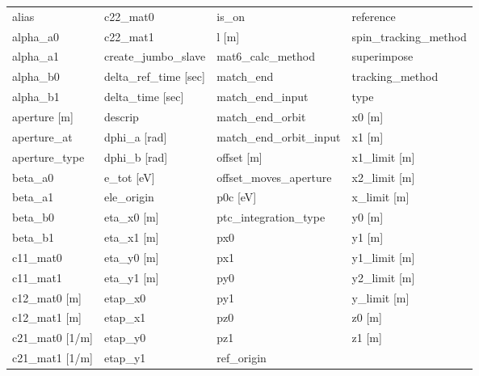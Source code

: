  \begin{tabular}{llll} \toprule
alias                          & c22_mat0                       & is_on                          & reference                      \\
alpha_a0                       & c22_mat1                       & l [m]                          & spin_tracking_method           \\
alpha_a1                       & create_jumbo_slave             & mat6_calc_method               & superimpose                    \\
alpha_b0                       & delta_ref_time [sec]           & match_end                      & tracking_method                \\
alpha_b1                       & delta_time [sec]               & match_end_input                & type                           \\
aperture [m]                   & descrip                        & match_end_orbit                & x0 [m]                         \\
aperture_at                    & dphi_a [rad]                   & match_end_orbit_input          & x1 [m]                         \\
aperture_type                  & dphi_b [rad]                   & offset [m]                     & x1_limit [m]                   \\
beta_a0                        & e_tot [eV]                     & offset_moves_aperture          & x2_limit [m]                   \\
beta_a1                        & ele_origin                     & p0c [eV]                       & x_limit [m]                    \\
beta_b0                        & eta_x0 [m]                     & ptc_integration_type           & y0 [m]                         \\
beta_b1                        & eta_x1 [m]                     & px0                            & y1 [m]                         \\
c11_mat0                       & eta_y0 [m]                     & px1                            & y1_limit [m]                   \\
c11_mat1                       & eta_y1 [m]                     & py0                            & y2_limit [m]                   \\
c12_mat0 [m]                   & etap_x0                        & py1                            & y_limit [m]                    \\
c12_mat1 [m]                   & etap_x1                        & pz0                            & z0 [m]                         \\
c21_mat0 [1/m]                 & etap_y0                        & pz1                            & z1 [m]                         \\
c21_mat1 [1/m]                 & etap_y1                        & ref_origin                     &                                \\
 \bottomrule
 \end{tabular}
 \vfill

